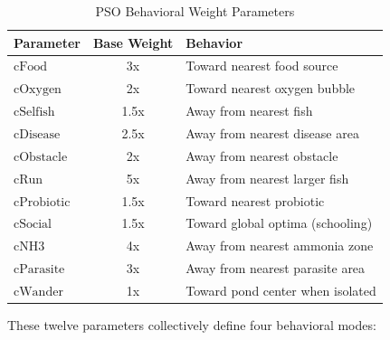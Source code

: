 \documentclass[conference]{IEEEtran}
\begin{document}
\begin{table}[htbp]
\centering
\caption{PSO Behavioral Weight Parameters}
\label{tab:pso_params}
\begin{tabular}{|l|c|l|}
\hline
\textbf{Parameter} & \textbf{Base Weight} & \textbf{Behavior} \\ \hline
${\text{cFood}}$      & 3x   & Toward nearest food source \\ \hline
${\text{cOxygen}}$    & 2x   & Toward nearest oxygen bubble \\ \hline
${\text{cSelfish}}$   & 1.5x & Away from nearest fish \\ \hline
${\text{cDisease}}$   & 2.5x & Away from nearest disease area \\ \hline
${\text{cObstacle}}$  & 2x   & Away from nearest obstacle \\ \hline
${\text{cRun}}$       & 5x   & Away from nearest larger fish \\ \hline
${\text{cProbiotic}}$ & 1.5x & Toward nearest probiotic \\ \hline
${\text{cSocial}}$    & 1.5x & Toward global optima (schooling) \\ \hline
${\text{cNH3}}$       & 4x   & Away from nearest ammonia zone \\ \hline
${\text{cParasite}}$  & 3x   & Away from nearest parasite area \\ \hline
${\text{cWander}}$    & 1x   & Toward pond center when isolated \\ \hline
\end{tabular}
\end{table}

These twelve parameters collectively define four behavioral modes:
\end{document}
